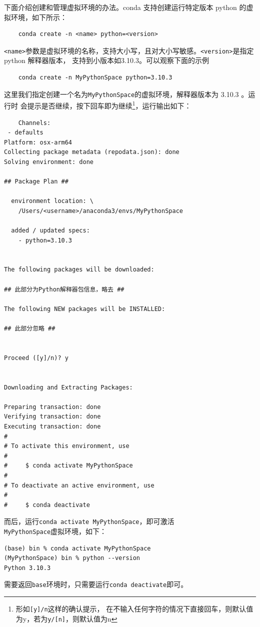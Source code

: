 \documentclass[UTF8]{ctexart}
\begin{document}
下面介绍创建和管理虚拟环境的办法。conda 支持创建运行特定版本 python 的虚拟环境，如下所示：
\begin{lstlisting}
    conda create -n <name> python=<version>
\end{lstlisting}
\texttt{<name>}参数是虚拟环境的名称，支持大小写，且对大小写敏感。\texttt{<version>}是指定 python 解释器版本，
支持到小版本如3.10.3。可以观察下面的示例
\begin{lstlisting}
    conda create -n MyPythonSpace python=3.10.3
\end{lstlisting}
这里我们指定创建一个名为\texttt{MyPythonSpace}的虚拟环境，解释器版本为 3.10.3 。运行时
会提示是否继续，按下回车即为继续\footnote{形如\texttt{[y]/n}这样的确认提示，
在不输入任何字符的情况下直接回车，则默认值为y，若为\texttt{y/[n]}，则默认值为n}，运行输出如下：
\begin{lstlisting}
    Channels:
 - defaults
Platform: osx-arm64
Collecting package metadata (repodata.json): done
Solving environment: done

## Package Plan ##

  environment location: \
    /Users/<username>/anaconda3/envs/MyPythonSpace

  added / updated specs:
    - python=3.10.3


The following packages will be downloaded:

## 此部分为Python解释器包信息，略去 ##

The following NEW packages will be INSTALLED:

## 此部分忽略 ##


Proceed ([y]/n)? y


Downloading and Extracting Packages:
                                                                                                            
Preparing transaction: done
Verifying transaction: done
Executing transaction: done
#
# To activate this environment, use
#
#     $ conda activate MyPythonSpace
#
# To deactivate an active environment, use
#
#     $ conda deactivate

\end{lstlisting}
而后，运行\texttt{conda activate MyPythonSpace}，即可激活\\\texttt{MyPythonSpace}虚拟环境，如下：
\begin{lstlisting}
(base) bin % conda activate MyPythonSpace
(MyPythonSpace) bin % python --version
Python 3.10.3
\end{lstlisting}
需要返回\texttt{base}环境时，只需要运行\texttt{conda deactivate}即可。
\end{document}
